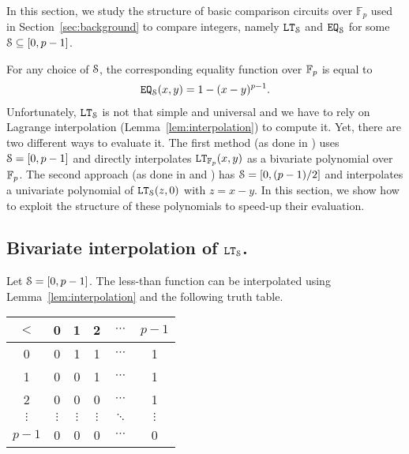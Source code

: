 In this section, we study the structure of basic comparison circuits over $\mathbb{F}_p$ used in Section~\ref{sec:background} to compare integers, namely $\LT_{\S}$ and $\EQ_{\S}$ for some $\S \subseteq [0, p-1]$. 

For any choice of $\S$, the corresponding equality function over $\F_p$ is equal to
\begin{align*}
  \EQ_{\S}(x,y) = 1 - (x-y)^{p-1}.
\end{align*}
Unfortunately, $\LT_{\S}$ is not that simple and universal and we have to rely on Lagrange interpolation (Lemma~\ref{lem:interpolation}) to compute it. 
Yet, there are two different ways to evaluate it.
The first method (as done in \cite{TLWRK20}) uses $\S = [0,p-1]$ and directly interpolates $\LT_{\F_p}(x,y)$ as a bivariate polynomial over $\F_{p}$.
The second approach (as done in \cite{NGEG17} and \cite{PoPETS:SFR20}) has $\S = [0, (p-1)/2]$ and interpolates a univariate polynomial of $\LT_{\S}(z, 0)$ with $z = x - y$.
In this section, we show how to exploit the structure of these polynomials to speed-up their evaluation.

\subsection{Bivariate interpolation of $\LT_\S$.}

  Let $\S = [0,p-1]$.
  The less-than function can be interpolated using Lemma~\ref{lem:interpolation} and the following truth table.
  \begin{table}[h]
    \centering
    \begin{tabular}{c|ccccc}
        $<$ & 0 & 1 & 2 & $\cdots$ & $p-1$ \\
        \hline
        0 & 0 & 1 & 1 & $\cdots$ & 1 \\
        1 & 0 & 0 & 1 & $\cdots$ & 1 \\
        2 & 0 & 0 & 0 & $\cdots$ & 1 \\
        $\vdots$ & $\vdots$ & $\vdots$ & $\vdots$ & $\ddots$ & $\vdots$ \\
        $p-1$ & 0 & 0 & 0 & $\cdots$ & 0 \\
    \end{tabular}
  \end{table}
    
